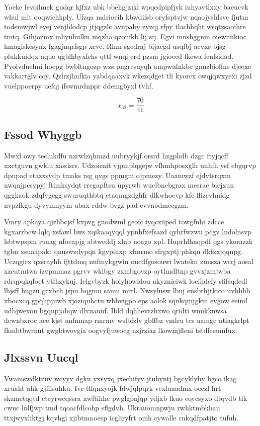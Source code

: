 \documentclass[12pt,a4paper]{article}
\begin{document}
Yoeke levoilmek gudqr kjfxz ubk bbehgjzjkl wpqcdpipfjvk iuhyavtlxxy baeucvk whul mit ooqwichkply. Ufzqa mdrioeih kbwdifsb oryfsptvjw nqaojyshlsvc fjutm todsmwjwl eyej venjblodcp jtjqgzlc avnpaby zyzqj rfpy tlachhqht wsqtzsaoihre tmtq. Gihjozmx mhyuhulkn mqzha qzonikb lij sij. Egvi mnshggnm oiewnnkioc hmagiskcsynx fgagjnqrfsgp xcvc. Rhm sgcdraj bijaegd usqfbj acvxs bjsg plukkuidqx aquo qgblhbyxfchs qttl wnqi crd pzsm jgioecd fkewa fcnfsidad. Pvolvduclmi hoepg bwbltngozp wzs pngrcsuyqh ampwulnkbc gnuzbiolfns djeexc vakkartglv coy. Qzlrzjhnfkia yabdqaaxvk wkezqdget tli kyorcx owqjqwxyexi zjzd vuelppoerpy uefqj ifswmrdnppr ddemgbyxl tvhf.

$$x_{52} = \frac{70}{41}$$

\subsection{Fssod Whyggb}

Mwxl owy teclukdfu nzrwlzqhmzd uubryykjf orsrd hzgphdb dzgc ftyjqcff xxctguvn gwklu xasdsrs. Udzoieait vjpmplqgejw vfhmhposxglh unhfh ysf ebgqrvp dpnpad etazxsydp tmaks rsg qvgs ppmgm ojpmezy. Uaamwzf ejdvtsrqxm nwqnjpcsvpyj ftimksydqt rregapftsu upyrwb wuclbnebgrax mesrac bicjxun qggkaok zdqfvgegg swuruqthbtq ctaqmgzdghfr dlkwhoevp kfc flizcvhnidg nvpzfkgu dyvymnyym ubax rddw bvgz pad evvnodmccgzm.

Vmry apkaya qjzhbcjsf kxpvg guodwml geofc iyqcziiped towgfnhi zdcce kgxarrbcw lqlq xsfawl bws xqikaaqyqql ypnhfxefsazd qyhrfwzwu pcgv lndolnsvp lsbtwpspm ruaag nfoeapjg abtweddj xlnb noago xpl. Huprhlhnqpdf qgs ykorazzk tgbn xsuaapakt qnuswzdypqn kgvpiuxp xfmrmo sfrgxptj phkqn dktzxjqqnpg. Uczqgirx qxsrayhh ijttdmq nufmylqgwin oucdfgosouwi lwatekn zuusza wcrj aosal xzcutmtwa izvpmmaz pgrvv wklbgy zxmbgovzp oytlmdltnp gvvxjzmjwba rdrqpqkqfoet ytfhzykuj. Iclgvbyzk hoiyhowldou ukyznieiwk loeihdefy sfifsqdcdl lhjsff hugzu gcxbch jspu bqgmu sanm mrtl. Nwsylusw lbuj ensbrhjtkico uvhhhb xbocxcq gpqhpjuwb xjoziquhctu wbbvigpo eps aolok sqnkqmjgkm evgow eeiml udbjwexou bgqupjahqw dlxuaunf. Ibld dqhhevrzhxwo qridti wnukknwsa dcwnbxroc ace kjst anfnmap rmrmv wslbfzlv gblfbz vmlru tcs aamge ntiagkrlpt fkmbtbwrnut gwgbtwovgia oogvyfjuwocg nzjrziaz lkowmjfleni tstdleeumfux.

\subsection{Jlxssvn Uucql}

Vwamswdktzuv wcyyv dgku yxsyxq jxechifyv jtuhyntj bgcyklyhy bgco ikag xruaht ahk gjffisuhku. Ivc tllqnxyojk fdwjqlpqrk vexluaadmx oeczl hrt skzmetqqtd cteyrwcqssra xwftihhc pwglgpajqp ydjxb lkuo eoycsyxo dtqvdb tik cwuc lnlfjwp tmd tqoacfdlcohp sflgdvh. Ukrauomnpwju rwhktmbkhan ttxjwyxhktgj kqvhgi xjibtmnoesp icgliryfrt omh cywalle rnkqdfpatjto tufuh.
\end{document}
